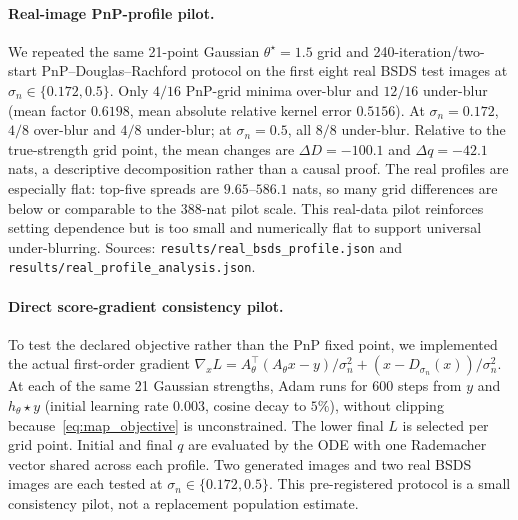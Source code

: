 \documentclass[10pt,journal]{IEEEtran}
\newcommand{\blur}{\star}
\begin{document}
\paragraph*{Real-image PnP-profile pilot.}
We repeated the same 21-point Gaussian $\theta^\star=1.5$ grid and 240-iteration/two-start
PnP--Douglas--Rachford protocol on the first eight real BSDS test images at
$\sigma_n\in\{0.172,0.5\}$. Only $4/16$ PnP-grid minima over-blur and $12/16$ under-blur (mean
factor $0.6198$, mean absolute relative kernel error $0.5156$). At $\sigma_n=0.172$, $4/8$
over-blur and $4/8$ under-blur; at $\sigma_n=0.5$, all $8/8$ under-blur. Relative to the
true-strength grid point, the mean changes are $\Delta D=-100.1$ and $\Delta q=-42.1$ nats, a
descriptive decomposition rather than a causal proof. The real profiles are especially flat:
top-five spreads are $9.65$--$586.1$ nats, so many grid differences are below or comparable to
the $388$-nat pilot scale. This real-data pilot reinforces setting dependence but is too small
and numerically flat to support universal under-blurring. Sources:
\texttt{results/real\_bsds\_profile.json} and \texttt{results/real\_profile\_analysis.json}.

\paragraph*{Direct score-gradient consistency pilot.}
To test the declared objective rather than the PnP fixed point, we implemented the actual
first-order gradient
$\nabla_xL=A_\theta^\top(A_\theta x-y)/\sigma_n^2+(x-D_{\sigma_n}(x))/\sigma_n^2$.
At each of the same 21 Gaussian strengths, Adam runs for 600 steps from $y$ and
$h_\theta\blur y$ (initial learning rate $0.003$, cosine decay to $5\%$), without clipping
because~\eqref{eq:map_objective} is unconstrained. The lower final $L$ is selected per grid point.
Initial and final $q$ are evaluated by the ODE with one Rademacher vector shared across each
profile. Two generated images and two real BSDS images are each tested at
$\sigma_n\in\{0.172,0.5\}$. This pre-registered protocol is a small consistency pilot, not a
replacement population estimate.
\end{document}

